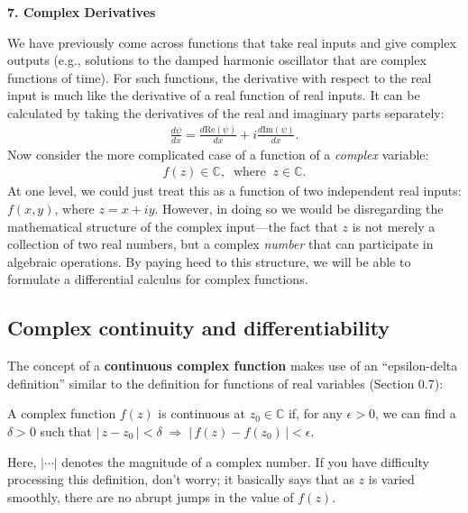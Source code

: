 \documentclass[10pt,a4paper]{article}
\begin{document}
\setcounter{page}{45}

\noindent
{\Large \textbf{7. Complex Derivatives}}
\vskip 0.2in

\label{complex-derivatives}

We have previously come across functions that take real inputs and
give complex outputs (e.g., solutions to the damped harmonic
oscillator that are complex functions of time).  For such functions,
the derivative with respect to the real input is much like the
derivative of a real function of real inputs.  It can be calculated by
taking the derivatives of the real and imaginary parts separately:
\begin{align}
  \frac{d\psi}{dx} = \frac{d\mathrm{Re}(\psi)}{dx} + i \frac{d\mathrm{Im}(\psi)}{dx}.
\end{align}
Now consider the more complicated case of a function of a
\textit{complex} variable:
\begin{align}
  f(z) \in \mathbb{C}, \;\;\mathrm{where}\;\; z \in \mathbb{C}.
\end{align}
At one level, we could just treat this as a function of two
independent real inputs: $f(x,y)$, where $z = x + i y$. However, in
doing so we would be disregarding the mathematical structure of the
complex input---the fact that $z$ is not merely a collection of two
real numbers, but a complex \textit{number} that can participate in
algebraic operations.  By paying heed to this structure, we will be
able to formulate a differential calculus for complex functions.

\subsection{Complex continuity and differentiability}
\label{complex-continuity-and-differentiability}

The concept of a \textbf{continuous complex function} makes use of an
``epsilon-delta definition'' similar to the definition for functions
of real variables (Section 0.7):

\begin{framed}
  \noindent
  A complex function $f(z)$ is continuous at $z_0 \in \mathbb{C}$ if, for any $\epsilon > 0$, we can find a $\delta > 0$ such that $\big|\, z - z_0 \,\big| < \delta \; \Rightarrow \; \big|\, f(z) - f(z_0) \,\big| < \epsilon$.
\end{framed}

\noindent
Here, $|\cdots|$ denotes the magnitude of a complex number.  If you
have difficulty processing this definition, don't worry; it basically
says that as $z$ is varied smoothly, there are no abrupt jumps in the
value of $f(z)$.
\end{document}
